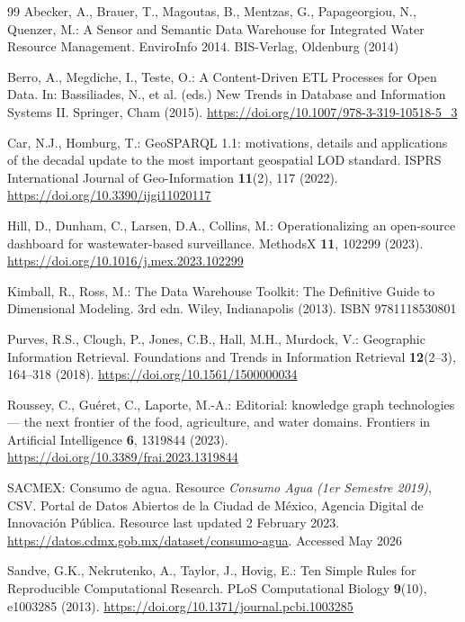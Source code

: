 \documentclass[runningheads]{llncs}
\newif\ifmarcarcambios
\newcommand{\icokg}[1]{\ifmarcarcambios\textcolor{nuevo}{#1}\else#1\fi}
\renewcommand{\_}{\origunderscore\allowbreak}
\begin{document}
\begingroup\footnotesize\setlength{\parskip}{0pt}
\begin{thebibliography}{99}
 Abecker, A., Brauer, T., Magoutas, B., Mentzas, G., Papageorgiou, N., Quenzer, M.: A Sensor and Semantic Data Warehouse for Integrated Water Resource Management. EnviroInfo 2014. BIS-Verlag, Oldenburg (2014)

 Berro, A., Megdiche, I., Teste, O.: A Content-Driven ETL Processes for Open Data. In: Bassiliades, N., et al. (eds.) New Trends in Database and Information Systems II. Springer, Cham (2015). \url{https://doi.org/10.1007/978-3-319-10518-5_3}

\icokg{ Car, N.J., Homburg, T.: GeoSPARQL 1.1: motivations, details and applications of the decadal update to the most important geospatial LOD standard. ISPRS International Journal of Geo-Information \textbf{11}(2), 117 (2022). \url{https://doi.org/10.3390/ijgi11020117}}

 Hill, D., Dunham, C., Larsen, D.A., Collins, M.: Operationalizing an open-source dashboard for wastewater-based surveillance. MethodsX \textbf{11}, 102299 (2023). \url{https://doi.org/10.1016/j.mex.2023.102299}

 Kimball, R., Ross, M.: The Data Warehouse Toolkit: The Definitive Guide to Dimensional Modeling. 3rd edn. Wiley, Indianapolis (2013). ISBN 9781118530801

 Purves, R.S., Clough, P., Jones, C.B., Hall, M.H., Murdock, V.: Geographic Information Retrieval. Foundations and Trends in Information Retrieval \textbf{12}(2--3), 164--318 (2018). \url{https://doi.org/10.1561/1500000034}

\icokg{ Roussey, C., Gu\'eret, C., Laporte, M.-A.: Editorial: knowledge graph technologies --- the next frontier of the food, agriculture, and water domains. Frontiers in Artificial Intelligence \textbf{6}, 1319844 (2023). \url{https://doi.org/10.3389/frai.2023.1319844}}

 SACMEX: Consumo de agua. \icokg{Resource \emph{Consumo Agua (1er Semestre 2019)}, CSV. Portal de Datos Abiertos de la Ciudad de M\'exico, Agencia Digital de Innovaci\'on P\'ublica. Resource last updated 2 February 2023. \url{https://datos.cdmx.gob.mx/dataset/consumo-agua}. Accessed May 2026}

 Sandve, G.K., Nekrutenko, A., Taylor, J., Hovig, E.: Ten Simple Rules for Reproducible Computational Research. PLoS Computational Biology \textbf{9}(10), e1003285 (2013). \url{https://doi.org/10.1371/journal.pcbi.1003285}


\end{thebibliography}
\end{document}
